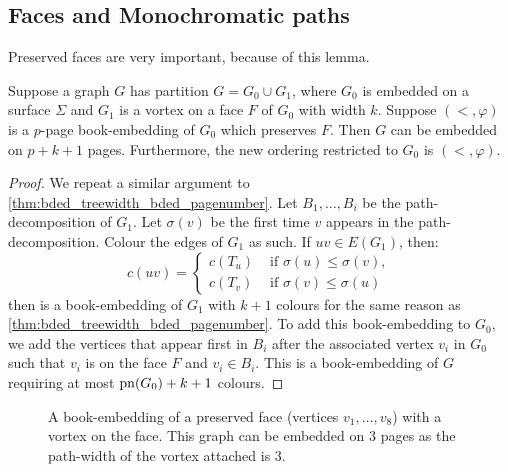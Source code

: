 \subsection{Faces and Monochromatic paths}

Preserved faces are very important, because of this lemma.

\begin{lemma}\label{lem:preserved_faces_pagenumber}
	Suppose a graph \(G\) has partition \(G = G_0 \cup G_1\), where \(G_0\) is embedded on a surface $\Sigma$ and \(G_1\) is a vortex on a face $F$ of $G_0$ with width \(k\). Suppose $(<, \varphi)$ is a $p$-page book-embedding of \(G_0\) which preserves \(F\). Then $G$ can be embedded on \(p + k + 1\) pages. Furthermore, the new ordering restricted to $G_0$ is $(<, \varphi)$.
\end{lemma}

\begin{proof}
	We repeat a similar argument to \cref{thm:bded_treewidth_bded_pagenumber}. Let \(B_1, \ldots, B_i\) be the path-decomposition of \(G_1\). Let \(\sigma(v)\) be the first time \(v\) appears in the path-decomposition. Colour the edges of \(G_1\) as such. If \(uv \in E(G_1)\), then:
	\begin{equation}
		c(uv) =
		\begin{cases}
			c(T_u) & \text{ if } \sigma(u) \leq \sigma(v), \\
			c(T_v) & \text{ if } \sigma(v) \leq \sigma(u)
		\end{cases}
	\end{equation}
	then is a book-embedding of \(G_1\) with \(k+1\) colours for the same reason as \cref{thm:bded_treewidth_bded_pagenumber}.
	To add this book-embedding to \(G_0\), we add the vertices that appear first in \(B_i\) after the associated vertex \(v_i\) in \(G_0\) such that \(v_i\) is on the face \(F\) and \(v_i \in B_i\). This is a book-embedding of \(G\) requiring at most \(\operatorname{pn}(G_0) + k + 1\) colours.
\end{proof}

\begin{figure}
	\centering
	
	\caption[Book-embedding of a preserved face]{A book-embedding of a preserved face (vertices $v_1, \ldots , v_8$) with a vortex on the face. This graph can be embedded on $3$ pages as the path-width of the vortex attached is 3. }\label{fig:preserved_face}
\end{figure}


